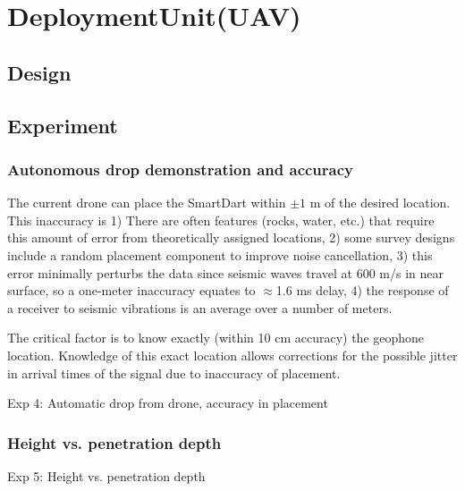 \section{DeploymentUnit(UAV)}\label{sec:DeploymentUnit(UAV)}

\subsection{Design}



\subsection{Experiment}


\subsubsection{Autonomous drop demonstration and accuracy}

The current drone can place the SmartDart within $\pm1$ m of the desired location.  This inaccuracy is 
1)     There are often features (rocks, water, etc.) that require this amount of error from theoretically assigned locations,
2)     some survey designs include a random placement component to improve noise cancellation,
3)     this error minimally perturbs  the data since seismic waves travel at 600 m/s in near surface, so a one-meter inaccuracy equates to $\approx$1.6 ms delay,
4)     the response of a receiver to seismic vibrations is an average over a number of meters.

The critical factor is to know exactly (within 10 cm accuracy)  the geophone location. Knowledge of this exact location allows corrections for the possible jitter in arrival times of the signal due to inaccuracy of placement.


Exp 4: Automatic drop from drone, accuracy in placement




\subsubsection{Height vs. penetration depth}
Exp 5: Height vs. penetration depth



